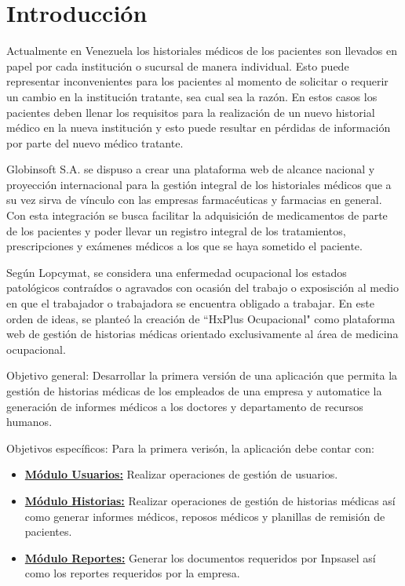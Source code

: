 \chapter*{Introducción}

Actualmente en Venezuela los historiales médicos de los pacientes son llevados en papel por cada institución o sucursal de manera individual. Esto puede representar inconvenientes para los pacientes al momento de solicitar o requerir un cambio en la institución tratante, sea cual sea la razón. En estos casos los pacientes deben llenar los requisitos para la realización de un nuevo historial médico en la nueva institución y esto puede resultar en pérdidas de información por parte del nuevo médico tratante.

Globinsoft S.A. se dispuso a crear una plataforma web de alcance nacional y proyección internacional para la gestión integral de los historiales médicos que a su vez sirva de vínculo con las empresas farmacéuticas y farmacias en general. Con esta integración se busca facilitar la adquisición de medicamentos de parte de los pacientes y poder llevar un registro integral de los tratamientos, prescripciones y exámenes médicos a los que se haya sometido el paciente.

Según Lopcymat, se considera una enfermedad ocupacional los estados patológicos contraídos o agravados con ocasión del trabajo o exposisción al medio en que el trabajador o trabajadora se encuentra obligado a trabajar. En este orden de ideas, se planteó la creación de ``HxPlus Ocupacional" como plataforma web de gestión de historias médicas orientado exclusivamente al área de medicina ocupacional.

Objetivo general: Desarrollar la primera versión de una aplicación que permita la gestión de historias médicas de los empleados de una empresa y automatice la generación de informes médicos a los doctores y departamento de recursos humanos.

Objetivos específicos:
Para la primera verisón, la aplicación debe contar con:

\begin{itemize}
    \item \textbf{\underline{Módulo Usuarios:}} Realizar operaciones de gestión de usuarios.
    \item \textbf{\underline{Módulo Historias:}} Realizar operaciones de gestión de historias médicas así como generar informes médicos, reposos médicos y planillas de remisión de pacientes.
    \item \textbf{\underline{Módulo Reportes:}} Generar los documentos requeridos por Inpsasel así como los reportes requeridos por la empresa.
\end{itemize}

